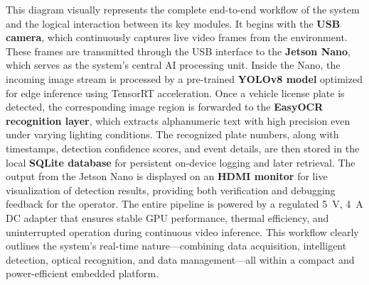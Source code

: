 This diagram visually represents the complete end-to-end workflow of the system and the logical interaction between its key modules.  
It begins with the \textbf{USB camera}, which continuously captures live video frames from the environment. These frames are transmitted through the USB interface to the \textbf{Jetson Nano}, which serves as the system's central AI processing unit. Inside the Nano, the incoming image stream is processed by a pre-trained \textbf{YOLOv8 model} optimized for edge inference using TensorRT acceleration.  
Once a vehicle license plate is detected, the corresponding image region is forwarded to the \textbf{EasyOCR recognition layer}, which extracts alphanumeric text with high precision even under varying lighting conditions.  
The recognized plate numbers, along with timestamps, detection confidence scores, and event details, are then stored in the local \textbf{SQLite database} for persistent on-device logging and later retrieval.  
The output from the Jetson Nano is displayed on an \textbf{HDMI monitor} for live visualization of detection results, providing both verification and debugging feedback for the operator.  
The entire pipeline is powered by a regulated \SI{5}{\volt}, \SI{4}{\ampere} DC adapter that ensures stable GPU performance, thermal efficiency, and uninterrupted operation during continuous video inference.  
This workflow clearly outlines the system’s real-time nature—combining data acquisition, intelligent detection, optical recognition, and data management—all within a compact and power-efficient embedded platform.

